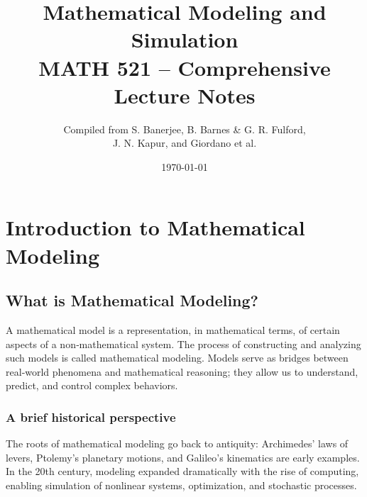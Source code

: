 \documentclass[12pt,a4paper]{book}
\title{\textbf{Mathematical Modeling and Simulation}\\[5pt]
\Large MATH 521 -- Comprehensive Lecture Notes}
\author{Compiled from S. Banerjee, B. Barnes \& G. R. Fulford, \\ J. N. Kapur, and Giordano et al.}
\date{\today}
\begin{document}
\maketitle
\tableofcontents

\chapter{Introduction to Mathematical Modeling}

\section{What is Mathematical Modeling?}
A mathematical model is a representation, in mathematical terms, of certain aspects of a non‑mathematical system. The process of constructing and analyzing such models is called mathematical modeling. Models serve as bridges between real‑world phenomena and mathematical reasoning; they allow us to understand, predict, and control complex behaviors.

\subsection*{A brief historical perspective}
The roots of mathematical modeling go back to antiquity: Archimedes’ laws of levers, Ptolemy’s planetary motions, and Galileo’s kinematics are early examples. In the 20th century, modeling expanded dramatically with the rise of computing, enabling simulation of nonlinear systems, optimization, and stochastic processes.
\end{document}
